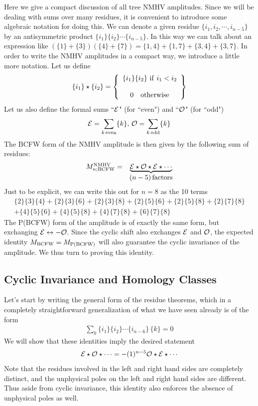 \documentclass[12pt]{article}
\newcommand{\be}{\begin{eqnarray}}
\newcommand{\ee}{\end{eqnarray}}
\begin{document}
Here we give a compact discussion of all tree NMHV amplitudes. Since we will be dealing with sums over many residues, it is convenient to introduce some algebraic notation for doing this. We can denote a given residue $\{i_1,i_2,\cdots,i_{n-5}\}$ by an antisymmetric product $\{i_1\} \{i_2\} \cdots \{i_{n-5}\}$. In this way we can talk about an expression like $(\{1\} + \{3\})(\{4\} + \{7\}) = \{1,4\} + \{1,7\} + \{3,4\} + \{3,7\}$. In order to write the NMHV amplitudes in a compact way, we introduce a little more notation. Let us define
\be
\{i_1\} \star \{i_2\} = \left\{\begin{array}{c} \{i_1\} \{i_2\} \, \, {\rm if} \, \, i_1 < i_2 \\  \\ 0 \, \, \, \, \, \, {\rm otherwise} \end{array}\right\}
\ee
Let us also define the formal sums ``${\cal E}$" (for ``even") and ``${\cal O}$" (for ``odd")
\be
{\cal E} = \sum_{k \, {\rm even}} \{k\}, \, {\cal O} = \sum_{k \, {\rm odd}} \{k\}
\ee
The BCFW form of the NMHV amplitude is then given by the following sum of residues:
\be
\begin{array}{cc} M^{{\rm NMHV}}_{n; {\rm BCFW}} = &
\underbrace{{\cal E} \star {\cal O} \star {\cal E} \star \cdots}\\ & (n-5) \, {\rm factors} \end{array}
\ee
Just to be explicit, we can write this out for $n=8$ as the 10 terms
\begin{eqnarray}
\{2\}\{3\}\{4\} + \{2\}\{3\}\{6\} + \{2\}\{3\}\{8\} + \{2\}\{5\}\{6\} + \{2\}\{5\}\{8\} + \{2\}\{7\}\{8\} \nonumber \\ + \{4\}\{5\}\{6\} + \{4\}\{5\}\{8\} + \{4\}\{7\}\{8\} + \{6\}\{7\}\{8\}
\end{eqnarray}
The P(BCFW) form of the amplitude is of exactly the same form, but exchanging ${\cal E} \leftrightarrow - {\cal O}$. Since the cyclic shift also exchanges ${\cal E}$ and ${\cal O}$, the expected identity $M_{{\rm BCFW}} = M_{{\rm P(BCFW)}}$ will also guarantee the cyclic invariance of the amplitude. We thus turn to proving this identity.

\subsection{Cyclic Invariance and Homology Classes}

Let's start by writing the general form of the residue theorems, which in a completely straightforward generalization of what we have seen already is of the form
\be
\sum_k \{i_1\} \{i_2\} \cdots \{i_{n-6}\} \, \{k\}= 0
\ee
We will show that these identities imply the desired statement
\be
{\cal E} \star {\cal O} \star \cdots = -(1)^{n-5} {\cal O} \star {\cal E} \star \cdots
\ee
Note that the residues involved in the left and right hand sides are completely distinct, and the unphysical poles on the left and right hand sides are different. Thus aside from cyclic invariance, this identity also enforces the absence of unphysical poles as well.
\end{document}
